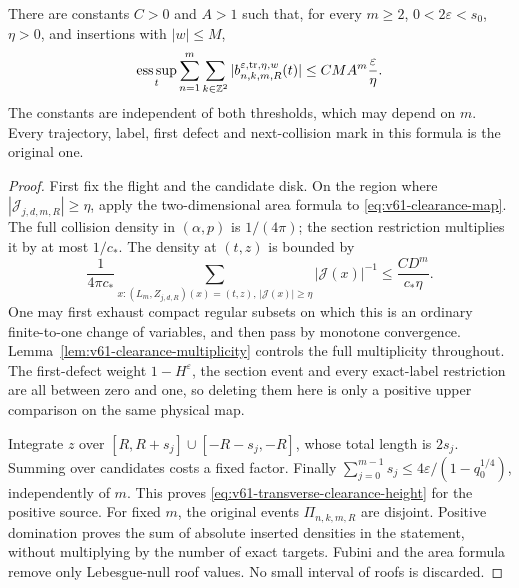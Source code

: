\begin{theorem}
\label{thm:v61-transverse-clearance}
There are constants $C>0$ and $A>1$ such that, for every $m\ge2$,
$0<2\varepsilon<s_0$, $\eta>0$, and insertions with $|w|\le M$,
\begin{equation}\label{eq:v61-transverse-clearance-height}
 \operatorname*{ess\,sup}_t\sum_{n=1}^{m}\sum_{k\in\Z^2}
 |b^{\varepsilon,\mathrm{tr},\eta,w}_{n,k,m,R}(t)|
                         \le CM A^m\frac{\varepsilon}{\eta}.
\end{equation}
The constants are independent of both thresholds, which may depend
on $m$. Every trajectory, label, first defect and next-collision mark
in this formula is the original one.
\end{theorem}
\begin{proof}
First fix the flight and the candidate disk. On the region where
$|\mathcal J_{j,d,m,R}|\ge\eta$, apply the two-dimensional area
formula to \eqref{eq:v61-clearance-map}. The full collision density
in $(\alpha,p)$ is $1/(4\pi)$; the section restriction multiplies
it by at most $1/c_*$. The density at $(t,z)$ is bounded by
\[
 \frac1{4\pi c_*}\sum_{x:(L_m,Z_{j,d,R})(x)=(t,z),\,
                       |\mathcal J(x)|\ge\eta}|\mathcal J(x)|^{-1}
       \le \frac{CD^m}{c_*\eta}.
\]
One may first exhaust compact regular subsets on which this is an
ordinary finite-to-one change of variables, and then pass by monotone
convergence. Lemma~\ref{lem:v61-clearance-multiplicity} controls the
full multiplicity throughout. The first-defect weight $1-H^{\varepsilon}$, the section event and every exact-label restriction
are all between zero and one, so deleting them here is only a positive
upper comparison on the same physical map.

Integrate $z$ over $[R,R+s_j]\cup[-R-s_j,-R]$, whose total length
is $2s_j$. Summing over candidates costs a fixed factor. Finally
$\sum_{j=0}^{m-1}s_j\le4\varepsilon/(1-q_0^{1/4})$, independently
of $m$. This proves \eqref{eq:v61-transverse-clearance-height} for
the positive source. For fixed $m$, the original events
$\Pi_{n,k,m,R}$ are disjoint. Positive domination proves the sum of
absolute inserted densities in the statement, without multiplying by
the number of exact targets. Fubini and the area formula remove only
Lebesgue-null roof values. No small interval of roofs is discarded.
\end{proof}

